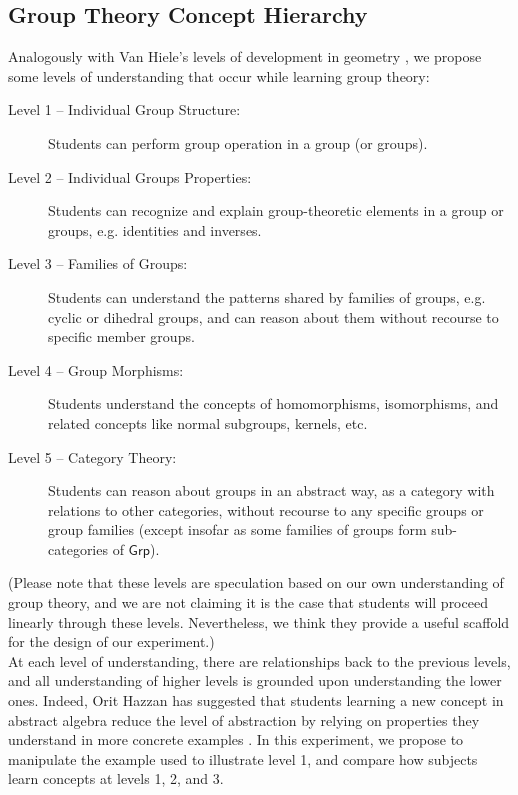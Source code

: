 \documentclass[11pt]{article}
\begin{document}
\subsection{Group Theory Concept Hierarchy}
Analogously with Van Hiele's levels of development in geometry \cite{Burger1986}, we propose some levels of understanding that occur while learning group theory:
\begin{description}
\item[Level 1 -- Individual Group Structure:] Students can perform group operation in a group (or groups).
\item[Level 2 -- Individual Groups Properties:] Students can recognize and explain group-theoretic elements in a group or groups, e.g. identities and inverses.
\item[Level 3 -- Families of Groups:] Students can understand the patterns shared by families of groups, e.g. cyclic or dihedral groups, and can reason about them without recourse to specific member groups.
\item[Level 4 -- Group Morphisms:] Students understand the concepts of homomorphisms, isomorphisms, and related concepts like normal subgroups, kernels, etc.
\item[Level 5 -- Category Theory:] Students can reason about groups in an abstract way, as a category with relations to other categories, without recourse to any specific groups or group families (except insofar as some families of groups form sub-categories of $\mathsf{Grp}$).
\end{description}
(Please note that these levels are speculation based on our own understanding of group theory, and we are not claiming it is the case that students will proceed linearly through these levels. Nevertheless, we think they provide a useful scaffold for the design of our experiment.) \\[11pt]
At each level of understanding, there are relationships back to the previous levels, and all understanding of higher levels is grounded upon understanding the lower ones. Indeed, Orit Hazzan has suggested that students learning a new concept in abstract algebra reduce the level of abstraction by relying on properties they understand in more concrete examples \cite{Hazzan1999}. In this experiment, we propose to manipulate the example used to illustrate level 1, and compare how subjects learn concepts at levels 1, 2, and 3.
 
\end{document}
